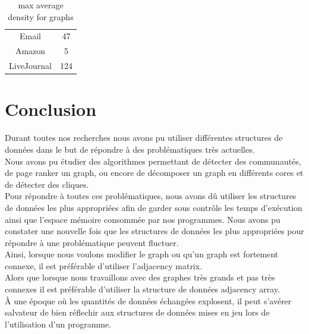\documentclass[a4paper,10pt]{report}
\begin{document}
\begin{table}[ht]
\caption{max average density for graphs}
\centering
\begin{tabular}{|c c |}
\hline
Email & 47 \\
Amazon & 5 \\
LiveJournal & 124  \\
\hline
\end{tabular}
\label {table:nonlin}
\end{table}
\chapter{Conclusion}
Durant toutes nos recherches nous avons pu utiliser différentes structures de données dans le but de répondre à des problématiques très actuelles. 
\\
Nous avons pu étudier des algorithmes permettant de détecter des communautés, de page ranker un graph, ou encore de décomposer un graph en différents cores et de détecter des cliques.
\\
\newline
Pour répondre à toutes ces problématiques, nous avons dû utiliser les structures de données les plus appropriées afin de garder sous contrôle les temps d'exécution ainsi que l'espace mémoire consommée par nos programmes.
\newline
Nous avons pu constater une nouvelle fois que les structures de données les plus appropriées pour répondre à une problématique peuvent fluctuer.
\\
Ainsi, lorsque nous voulons modifier le graph ou qu'un graph est fortement connexe, il est préférable d'utiliser l'adjacency matrix.\\
Alors que lorsque nous travaillons avec des graphes très grands et pas très connexes il est préférable d'utiliser la structure de données adjacency array.
\newline
\\
À une époque où les quantités de données échangées explosent, il peut s'avérer salvateur de bien réflechir aux structures de données mises en jeu lors de l'utilisation d'un programme.
\end{document}
